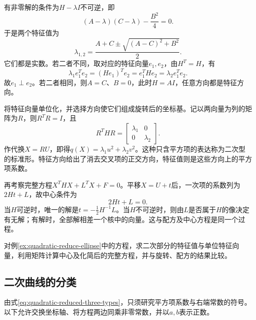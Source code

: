 有非零解的条件为\(H-\lambda I\)不可逆，即
\begin{equation*}
    (A-\lambda)(C-\lambda)-\frac{B^2}{4}=0 .
\end{equation*}
于是两个特征值为
\begin{equation}\label{eq:quadratic-eigenvalues}
    \lambda_{1,2}=\frac{A+C\pm\sqrt{(A-C)^2+B^2}}2 .
\end{equation}
它们都是实数。若二者不同，取对应的特征向量\(e_1,e_2\)，由\(H^T=H\)，有
\begin{equation*}
    \lambda_1 e_1^Te_2=(He_1)^Te_2=e_1^THe_2=\lambda_2 e_1^Te_2 .
\end{equation*}
故\(e_1\perp e_2\)。若二者相同，则\(A=C\)、\(B=0\)，此时\(H=AI\)，任意方向都是特征方向。

将特征向量单位化，并选择方向使它们组成旋转后的坐标基。记以两向量为列的矩阵为\(R\)，则\(R^TR=I\)，且
\begin{equation}\label{eq:quadratic-orthogonal-diagonalization}
    R^THR=\left[\begin{matrix}\lambda_1&0\\0&\lambda_2\end{matrix}\right] .
\end{equation}
作代换\(X=RU\)，即得\(q(X)=\lambda_1u^2+\lambda_2v^2\)。这种只含平方项的表达称为二次型的{\heiti{}标准形}。特征方向给出了消去交叉项的正交方向，特征值则是这些方向上的平方项系数。

再考察完整方程\(X^THX+L^TX+F=0\)。平移\(X=U+t\)后，一次项的系数列为\(2Ht+L\)，故中心条件为
\begin{equation}\label{eq:quadratic-center-matrix}
    2Ht+L=0 .
\end{equation}
当\(H\)可逆时，唯一的解是\(t=-\frac12H^{-1}L\)。当\(H\)不可逆时，则由\(L\)是否属于\(H\)的像决定有无解；有解时，全部解相差一个核中的向量。这与配方及中心方程是同一个过程。

\begin{example}
对例\ref{ex:quadratic-reduce-ellipse}中的方程，求二次部分的特征值与单位特征向量，利用矩阵计算中心及化简后的完整方程，并与旋转、配方的结果比较。
\end{example}



\newpage
\subsection{二次曲线的分类}
\label{subsec:quadratic-classification}

由式\eqref{eq:quadratic-reduced-three-types}，只须研究平方项系数与右端常数的符号。以下允许交换坐标轴、将方程两边同乘非零常数，并以\(a,b\)表示正数。


